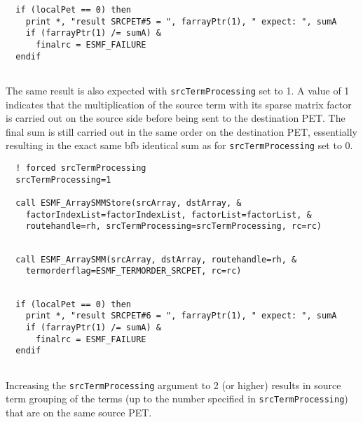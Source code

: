 
 \begin{verbatim}
  if (localPet == 0) then
    print *, "result SRCPET#5 = ", farrayPtr(1), " expect: ", sumA
    if (farrayPtr(1) /= sumA) &
      finalrc = ESMF_FAILURE
  endif
 
\end{verbatim}
 

   The same result is also expected with {\tt srcTermProcessing} set to 1. A
   value of 1 indicates that the multiplication of the source term with its
   sparse matrix factor is carried out on the source side before being sent to 
   the destination PET. The final sum is still carried out in the same order on
   the destination PET, essentially resulting in the exact same bfb identical
   sum as for {\tt srcTermProcessing} set to 0. 

 \begin{verbatim}
  ! forced srcTermProcessing
  srcTermProcessing=1
  
  call ESMF_ArraySMMStore(srcArray, dstArray, &
    factorIndexList=factorIndexList, factorList=factorList, &
    routehandle=rh, srcTermProcessing=srcTermProcessing, rc=rc)
 
\end{verbatim}
 

 \begin{verbatim}
  call ESMF_ArraySMM(srcArray, dstArray, routehandle=rh, &
    termorderflag=ESMF_TERMORDER_SRCPET, rc=rc)
 
\end{verbatim}
 

 \begin{verbatim}
  if (localPet == 0) then
    print *, "result SRCPET#6 = ", farrayPtr(1), " expect: ", sumA
    if (farrayPtr(1) /= sumA) &
      finalrc = ESMF_FAILURE
  endif
 
\end{verbatim}
 

   Increasing the {\tt srcTermProcessing} argument to 2 (or higher) results in 
   source term grouping of the terms (up to the number specified in 
   {\tt srcTermProcessing}) that are on the same source PET.
  

